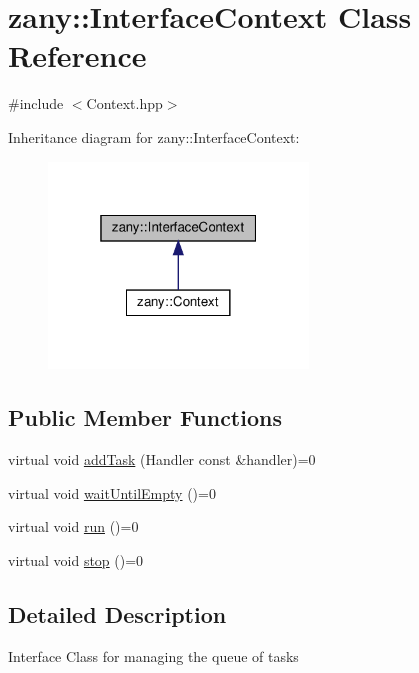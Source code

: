 \hypertarget{classzany_1_1_interface_context}{}\section{zany\+:\+:Interface\+Context Class Reference}
\label{classzany_1_1_interface_context}


{\ttfamily \#include $<$Context.\+hpp$>$}



Inheritance diagram for zany\+:\+:Interface\+Context\+:
\nopagebreak
\begin{figure}[H]
\begin{center}
\leavevmode
\includegraphics[width=196pt]{classzany_1_1_interface_context__inherit__graph}
\end{center}
\end{figure}
\subsection*{Public Member Functions}
\begin{DoxyCompactItemize}
\item 
virtual void \hyperlink{classzany_1_1_interface_context_a56da6cf74ba78321a0ebe0b334175176}{add\+Task} (Handler const \&handler)=0
\item 
virtual void \hyperlink{classzany_1_1_interface_context_a92f9597c6b6b7af0287a7f5178c2d063}{wait\+Until\+Empty} ()=0
\item 
virtual void \hyperlink{classzany_1_1_interface_context_a225552253490052c2fb75f05169b16a7}{run} ()=0
\item 
virtual void \hyperlink{classzany_1_1_interface_context_a13d40a4b37fca39813fe231e4081c022}{stop} ()=0
\end{DoxyCompactItemize}


\subsection{Detailed Description}
Interface Class for managing the queue of tasks 

